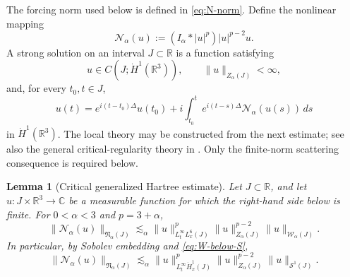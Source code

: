 \documentclass[preprint,12pt]{elsarticle}
\numberwithin{equation}{section}
\newtheorem{lemma}[theorem]{Lemma}
\theoremstyle{remark}
\newcommand{\R}{\mathbb R}
\newcommand{\C}{\mathbb C}
\newcommand{\dd}{\,d}
\newcommand{\Ncal}{\mathcal N_{\alpha}}
\newcommand{\Znorm}{Z_{\alpha}}
\newcommand{\Wnorm}{\mathcal W_{\alpha}}
\newcommand{\Nnorm}{\mathfrak N_{\alpha}}
\begin{document}
The forcing norm used below is defined in \eqref{eq:N-norm}. Define the nonlinear mapping
\[
  \Ncal(u):=(I_\alpha*|u|^p)|u|^{p-2}u.
\]
A strong solution on an interval $J\subset\R$ is a function satisfying
\[
  u\in C(J;\dot H^1(\R^3)),
  \qquad
  \|u\|_{\Znorm(J)}<\infty,
\]
and, for every $t_0,t\in J$,
\[
  u(t)=e^{i(t-t_0)\Delta}u(t_0)
  +i\int_{t_0}^{t}e^{i(t-s)\Delta}\Ncal(u(s))\dd s
\]
in $\dot H^1(\R^3)$. The local theory may be constructed from the next estimate; see also the general critical-regularity theory in \cite{AroraRoudenko2020}. Only the finite-norm scattering consequence is required below.

\begin{lemma}[Critical generalized Hartree estimate]\label{lem:critical-Hartree-estimate}
Let $J\subset\R$, and let $u:J\times\R^3\to\C$ be a measurable function for which the right-hand side below is finite. For $0<\alpha<3$ and $p=3+\alpha$,
\begin{equation}\label{eq:critical-Hartree-estimate}
  \|\Ncal(u)\|_{\Nnorm(J)}
  \lesssim_\alpha
  \|u\|_{L_t^\infty L_x^6(J)}^p
  \|u\|_{\Znorm(J)}^{p-2}
  \|u\|_{\Wnorm(J)}.
\end{equation}
In particular, by Sobolev embedding and \eqref{eq:W-below-S},
\begin{equation}\label{eq:critical-Hartree-estimate-S}
  \|\Ncal(u)\|_{\Nnorm(J)}
  \lesssim_\alpha
  \|u\|_{L_t^\infty\dot H_x^1(J)}^p
  \|u\|_{\Znorm(J)}^{p-2}
  \|u\|_{\mathcal S^1(J)}.
\end{equation}
\end{lemma}
\end{document}
